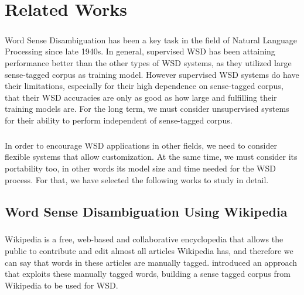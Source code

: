 \chapter{Related Works}
\label{Related Works}
\paragraph{}
Word Sense Disambiguation has been a key task in the field of Natural Language Processing since late 1940s. In general, supervised WSD has been attaining performance better than the other types of WSD systems, as they utilized large sense-tagged corpus as training model. However supervised WSD systems do have their limitations, especially for their high dependence on sense-tagged corpus, that their WSD accuracies are only as good as how large and fulfilling their training models are. For the long term, we must consider unsupervised systems for their ability to perform independent of sense-tagged corpus.

\paragraph{}
In order to encourage WSD applications in other fields, we need to consider flexible systems that allow customization. At the same time, we must consider its portability too, in other words its model size and time needed for the WSD process. For that, we have selected the following works to study in detail.

\section{Word Sense Disambiguation Using Wikipedia}
\paragraph{}
Wikipedia is a free, web-based and collaborative encyclopedia that allows the public to contribute and edit almost all articles Wikipedia has, and therefore we can say that words in these articles are manually tagged. \cite{wikipedia} introduced an approach that exploits these manually tagged words, building a sense tagged corpus from Wikipedia to be used for WSD.

